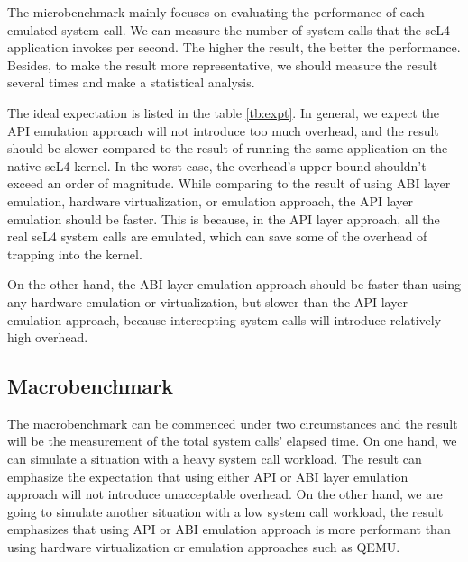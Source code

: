 The microbenchmark mainly focuses on evaluating the performance of each emulated system call. We can measure the number of system calls that the seL4 application invokes per second. The higher the result, the better the performance. Besides, to make the result more representative, we should measure the result several times and make a statistical analysis.

The ideal expectation is listed in the table \ref{tb:expt}. In general, we expect the API emulation approach will not introduce too much overhead, and the result should be slower compared to the result of running the same application on the native seL4 kernel. In the worst case, the overhead's upper bound shouldn't exceed an order of magnitude. While comparing to the result of using ABI layer emulation, hardware virtualization, or emulation approach, the API layer emulation should be faster. This is because, in the API layer approach, all the real seL4 system calls are emulated, which can save some of the overhead of trapping into the kernel.  

On the other hand, the ABI layer emulation approach should be faster than using any hardware emulation or virtualization, but slower than the API layer emulation approach, because intercepting system calls will introduce relatively high overhead.   

\subsection{Macrobenchmark}

The macrobenchmark can be commenced under two circumstances and the result will be the measurement of the total system calls' elapsed time. On one hand, we can simulate a situation with a heavy system call workload. The result can emphasize the expectation that using either API or ABI layer emulation approach will not introduce unacceptable overhead. On the other hand, we are going to simulate another situation with a low system call workload, the result emphasizes that using API or ABI emulation approach is more performant than using hardware virtualization or emulation approaches such as QEMU.